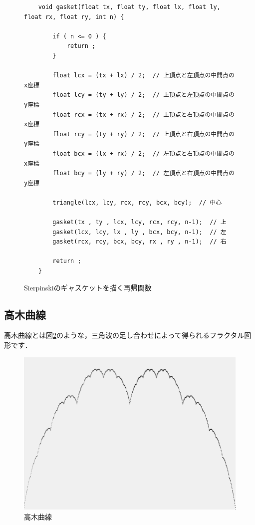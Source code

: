\documentclass[dvipdfmx]{jsarticle}
\theoremstyle{definition}
\begin{document}
\begin{figure}
\begin{center}
\begin{oframed}
\footnotesize
\begin{verbatim}
    void gasket(float tx, float ty, float lx, float ly, float rx, float ry, int n) {

        if ( n <= 0 ) {
            return ;
        }

        float lcx = (tx + lx) / 2;  // 上頂点と左頂点の中間点のx座標
        float lcy = (ty + ly) / 2;  // 上頂点と左頂点の中間点のy座標
        float rcx = (tx + rx) / 2;  // 上頂点と右頂点の中間点のx座標
        float rcy = (ty + ry) / 2;  // 上頂点と右頂点の中間点のy座標
        float bcx = (lx + rx) / 2;  // 左頂点と右頂点の中間点のx座標
        float bcy = (ly + ry) / 2;  // 左頂点と右頂点の中間点のy座標

        triangle(lcx, lcy, rcx, rcy, bcx, bcy);  // 中心

        gasket(tx , ty , lcx, lcy, rcx, rcy, n-1);  // 上
        gasket(lcx, lcy, lx , ly , bcx, bcy, n-1);  // 左
        gasket(rcx, rcy, bcx, bcy, rx , ry , n-1);  // 右

        return ;
    }
\end{verbatim}
\end{oframed}
\end{center}
\caption{Sierpinskiのギャスケットを描く再帰関数}
\label{code_gasket}
\end{figure}


\subsection{高木曲線}

高木曲線とは図\ref{pic_takagi_curve}のような，三角波の足し合わせによって得られるフラクタル図形です．

\begin{figure}
\begin{center}
    \includegraphics[scale=0.20]{figure/takagi_curve.png}
\end{center}
\caption{高木曲線}
\label{pic_takagi_curve}
\end{figure}
\end{document}
